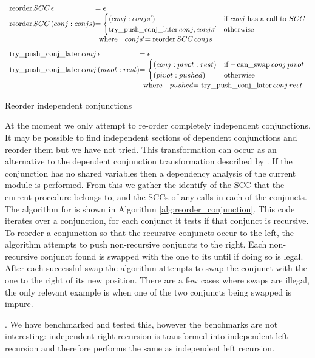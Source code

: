 \begin{algorithm}
\[
\begin{array}{l @{}l}
    \reorder SCC\,\epsilon      &= \epsilon \\
    \reorder SCC\,(conj:conjs)  &=
    \begin{cases}
        (conj:conjs') &
            \text{if } conj \text{ has a call to } SCC \\
        \trypushconjlater conj,conjs' &
            \text{otherwise} \\
    \end{cases} \\
                                &
    \begin{array}{l l @{}l}
        \text{where} & conjs'  &= \reorder SCC\,conjs \\
    \end{array} \\
\end{array}
\]
\[
\begin{array}{l @{}l}
    \trypushconjlater conj\,\epsilon    &= \epsilon \\
    \trypushconjlater conj\,(pivot:rest)&=
        \begin{cases}
            (conj:pivot:rest)   & \text{if } \neg \canswap conj\,pivot \\
            (pivot:pushed)      & \text{otherwise}
        \end{cases} \\
                                        &
    \begin{array}{l l @{}l}
        \text{where} & pushed &= \trypushconjlater conj\,rest \\
    \end{array} \\
\end{array}
\]
\caption{Reorder independent conjunctions}
\label{alg:reorder_conjunction}
\end{algorithm}

At the moment we only attempt to re-order completely independent
conjunctions.
It may be possible to find independent sections of dependent conjunctions
and reorder them but we have not tried.
This transformation can occur as an alternative to the dependent conjunction
transformation described by \citep{wang:2011:dep-par}.
If the conjunction has no shared variables then a dependency analysis of the
current module is performed.
From this we gather the identify of the SCC that the current procedure
belongs to,
and the SCCs of any calls in each of the conjuncts.
The algorithm for  is shown in Algorithm
\ref{alg:reorder_conjunction}.
This code iterates over a conjunction, for each conjunct it tests if that
conjunct is recursive.
To reorder a conjunction so that the recursive conjuncts occur to the left,
the algorithm attempts to push non-recursive conjuncts to the right.
Each non-recursive conjunct found is swapped with the one to its until if
doing so is legal.
After each successful swap the algorithm attempts to swap the conjunct with
the one to the right of its new position.
There are a few cases where swaps are illegal, the only relevant example is
when one of the two conjuncts being swapped is impure.

.
We have benchmarked and tested this,
however the benchmarks are not interesting:
independent right recursion is transformed into independent left
recursion and therefore performs the same as independent left recursion.

